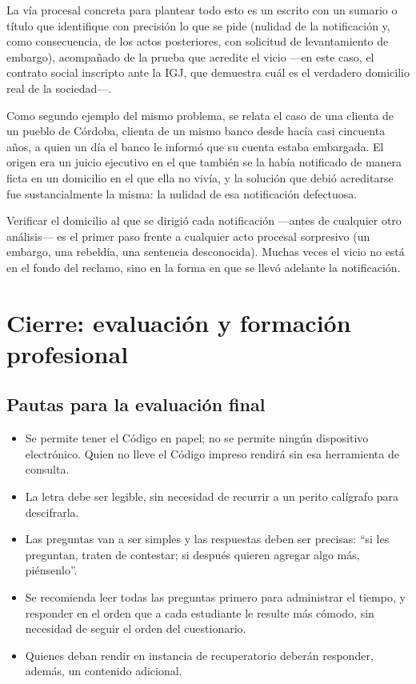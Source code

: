 \documentclass[12pt,oneside]{book}
\begin{document}
La vía procesal concreta para plantear todo esto es un escrito con un sumario o título que identifique con precisión lo que se pide (nulidad de la notificación y, como consecuencia, de los actos posteriores, con solicitud de levantamiento de embargo), acompañado de la prueba que acredite el vicio ---en este caso, el contrato social inscripto ante la IGJ, que demuestra cuál es el verdadero domicilio real de la sociedad---.

Como segundo ejemplo del mismo problema, se relata el caso de una clienta de un pueblo de Córdoba, clienta de un mismo banco desde hacía casi cincuenta años, a quien un día el banco le informó que su cuenta estaba embargada. El origen era un juicio ejecutivo en el que también se la había notificado de manera ficta en un domicilio en el que ella no vivía, y la solución que debió acreditarse fue sustancialmente la misma: la nulidad de esa notificación defectuosa.

\begin{important}
Verificar el domicilio al que se dirigió cada notificación ---antes de cualquier otro análisis--- es el primer paso frente a cualquier acto procesal sorpresivo (un embargo, una rebeldía, una sentencia desconocida). Muchas veces el vicio no está en el fondo del reclamo, sino en la forma en que se llevó adelante la notificación.
\end{important}

\chapter{Cierre: evaluación y formación profesional}

\section{Pautas para la evaluación final}

\begin{note}
\begin{itemize}
    \item Se permite tener el Código en papel; no se permite ningún dispositivo electrónico. Quien no lleve el Código impreso rendirá sin esa herramienta de consulta.
    \item La letra debe ser legible, sin necesidad de recurrir a un perito calígrafo para descifrarla.
    \item Las preguntas van a ser simples y las respuestas deben ser precisas: ``si les preguntan, traten de contestar; si después quieren agregar algo más, piénsenlo''.
    \item Se recomienda leer todas las preguntas primero para administrar el tiempo, y responder en el orden que a cada estudiante le resulte más cómodo, sin necesidad de seguir el orden del cuestionario.
    \item Quienes deban rendir en instancia de recuperatorio deberán responder, además, un contenido adicional.
\end{itemize}
\end{note}
\end{document}
